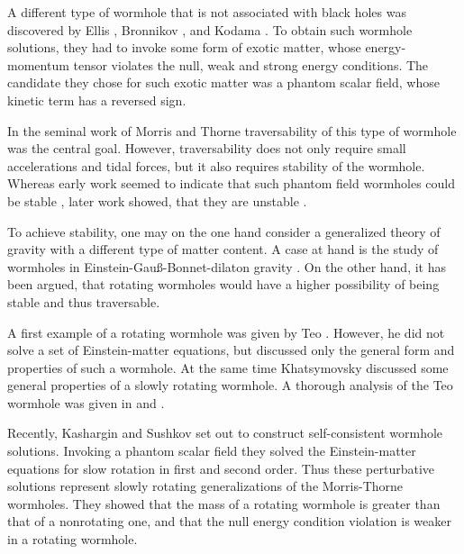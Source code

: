\documentclass[showpacs,preprintnumbers,amsmath,amssymb,floatfix]{revtex4}
\begin{document}
A different type of wormhole 
that is not associated with black holes
was discovered by Ellis \cite{Ellis:1973yv,Ellis:1979bh}, Bronnikov \cite{Bronnikov:1973fh},
and Kodama \cite{Kodama:1978dw}.
To obtain such wormhole solutions, they had to invoke
some form of exotic matter,
whose energy-momentum tensor violates the null,
weak and strong energy conditions.
The candidate they chose for such exotic matter 
was a phantom scalar field, whose kinetic term has a reversed sign.



In the seminal work of Morris and Thorne \cite{Morris:1988cz} 
traversability of this type of wormhole was the central goal.
However, traversability does not only require
small accelerations and tidal forces,
but it  also requires stability of the wormhole.
Whereas early work seemed to indicate
that such phantom field wormholes could be stable
\cite{Kodama:1978dw,ArmendarizPicon:2002km},
later work showed, that they are unstable
\cite{Shinkai:2002gv,Gonzalez:2008wd,Gonzalez:2008xk,Bronnikov:2011if,Dzhunushaliev:2013lna,Charalampidis:2013ixa}.

To achieve stability, one may on the one hand consider a 
generalized theory of gravity with a different type of matter content.
A case at hand is the study of wormholes in Einstein-Gau\ss -Bonnet-dilaton
gravity \cite{Kanti:2011jz,Kanti:2011yv}.
On the other hand, it has been argued, that rotating wormholes would
have a higher possibility of being stable \cite{Matos:2005uh}
and thus traversable.

A first example of a rotating 
wormhole was given by Teo \cite{Teo:1998dp}.
However,
he did not solve a set of Einstein-matter equations,
but discussed only the general form and properties of such a wormhole.
At the same time
Khatsymovsky \cite{Khatsymovsky:1998tv} discussed 
some general properties of
a slowly rotating wormhole.
A thorough analysis of the Teo wormhole
was given in \cite{PerezBergliaffa:2000ms} and \cite{Kuhfittig:2003wr}.


Recently, Kashargin and Sushkov \cite{Kashargin:2007mm,Kashargin:2008pk}
set out to construct self-consistent wormhole solutions.
Invoking a phantom scalar field
they solved the Einstein-matter equations
for slow rotation in first and second order. 
Thus these perturbative solutions represent slowly rotating 
generalizations of the Morris-Thorne wormholes.
They showed that the mass of a rotating wormhole
is greater than that of a nonrotating one,
and that the null energy condition violation is weaker in a
rotating wormhole.
\end{document}
